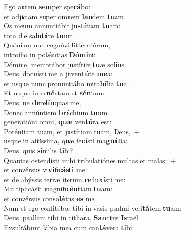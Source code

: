 \evenverse Ego autem \textbf{sem}per spe\textbf{rá}bo:~\*\\
\evenverse et adjíciam super omnem \textbf{lau}dem \textbf{tu}am.\\
\oddverse Os meum annuntiábit ju\textbf{stí}tiam \textbf{tu}am:~\*\\
\oddverse tota die salu\textbf{tá}re \textbf{tu}um.\\
\evenverse Quóniam non cognóvi litteratúram,~+\\
\evenverse  introíbo in po\textbf{tén}tias \textbf{Dó}\textbf{mi}ni:~\*\\
\evenverse Dómine, memorábor justítiæ \textbf{tu}æ so\textbf{lí}us.\\
\oddverse Deus, docuísti me a juven\textbf{tú}te \textbf{me}a:~\*\\
\oddverse et usque nunc pronuntiábo mira\textbf{bí}lia \textbf{tu}a.\\
\evenverse Et usque in se\textbf{né}ctam et \textbf{sé}\textbf{ni}um:~\*\\
\evenverse Deus, ne \textbf{de}re\textbf{lín}quas me,\\
\oddverse Donec annúntiem \textbf{brá}chium \textbf{tu}um~\*\\
\oddverse generatióni omni, \textbf{quæ} ven\textbf{tú}ra est:\\
\evenverse Poténtiam tuam, et justítiam tuam, Deus,~+\\
\evenverse  usque in altíssima, quæ fe\textbf{cí}sti ma\textbf{gná}\textbf{li}a:~\*\\
\evenverse Deus, quis \textbf{sí}milis \textbf{ti}bi?\\
\oddverse Quantas ostendísti mihi tribulatiónes multas et malas:~+\\
\oddverse  et convérsus vi\textbf{vi}fi\textbf{cá}\textbf{sti} me:~\*\\
\oddverse et de abýssis terræ íterum \textbf{re}du\textbf{xí}sti me:\\
\evenverse Multiplicásti magnifi\textbf{cén}tiam \textbf{tu}am:~\*\\
\evenverse et convérsus conso\textbf{lá}tus \textbf{es} me.\\
\oddverse Nam et ego confitébor tibi in vasis psalmi veri\textbf{tá}tem \textbf{tu}am:~\*\\
\oddverse Deus, psallam tibi in cíthara, \textbf{San}ctus \textbf{Is}raël.\\
\evenverse Exsultábunt lábia mea cum can\textbf{tá}vero \textbf{ti}bi:~\*\\
